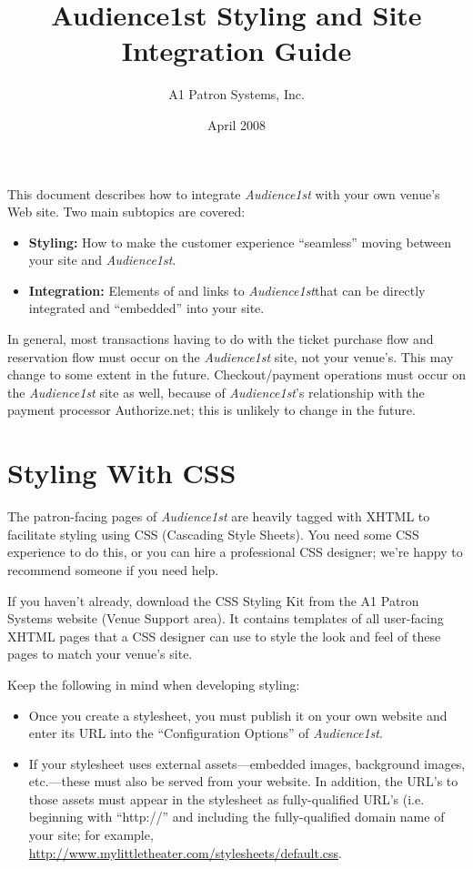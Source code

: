 \documentclass{article}
\title{Audience1st Styling and Site Integration Guide}
\author{A1 Patron Systems, Inc.}
\date{April 2008}
\newcommand{\af}{{\em Audience1st}}
\begin{document}
\maketitle

This document describes how to integrate \af{} with your own venue's Web
site.  Two main subtopics are covered:

\begin{itemize}
\item \textbf{Styling:} How to make the customer experience ``seamless''
  moving between your site and \af.
\item \textbf{Integration:} Elements of and links to \af that can be
  directly integrated and ``embedded'' into your site.
\end{itemize}

In general, most transactions having to do with the ticket purchase flow
and reservation flow must occur on the \af{} site, not your venue's.
This may change to some extent in the future.  Checkout/payment
operations must occur on the \af{} site as well, because of \af's
relationship with the payment processor Authorize.net; this is unlikely
to change in the future.

\section{Styling With CSS}
\label{sec:creating_css}

The patron-facing pages of \af{} are heavily tagged with XHTML to
facilitate styling using CSS (Cascading Style Sheets).  You  need some
CSS experience to do this, or you can hire a professional CSS designer;
we're happy to recommend someone if you  need help.

If you haven't already, download the CSS Styling Kit from the A1 Patron
Systems website (Venue Support area).  It contains templates of all
user-facing XHTML pages that a CSS designer can use to style the look
and feel of these pages to match your venue's site.

Keep the following in mind when developing styling:

\begin{itemize}
\item Once you create a stylesheet, you must publish it on your own
  website and enter its URL into the ``Configuration Options'' of \af.  

\item If your stylesheet uses external assets---embedded images,
  background images, etc.---these must also be served from your website.
  In addition, the URL's to those assets must appear in the stylesheet
  as fully-qualified URL's (i.e. beginning with ``http://'' and
  including the fully-qualified domain name of your site; for example,
  \url{http://www.mylittletheater.com/stylesheets/default.css}. 

\end{itemize}
\end{document}
